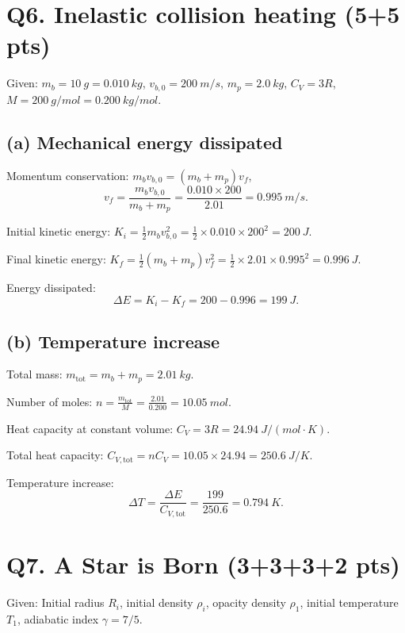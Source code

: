 \documentclass[11pt]{article}
\newcommand{\ans}[1]{\boxed{\displaystyle #1}}
\begin{document}
\section*{Q6. Inelastic collision heating (5+5 pts)}

Given: \(m_b = \SI{10}{g} = \SI{0.010}{kg}\),
\(v_{b,0} = \SI{200}{m/s}\),
\(m_p = \SI{2.0}{kg}\),
\(C_V = 3R\),
\(M = \SI{200}{g/mol} = \SI{0.200}{kg/mol}\).

\subsection*{(a) Mechanical energy dissipated}
Momentum conservation: \(m_b v_{b,0} = (m_b + m_p)v_f\),
\[
v_f = \frac{m_b v_{b,0}}{m_b + m_p} = \frac{0.010 \times 200}{2.01} = \SI{0.995}{m/s}.
\]

Initial kinetic energy: \(K_i = \frac{1}{2}m_b v_{b,0}^2 = \frac{1}{2} \times 0.010 \times 200^2 = \SI{200}{J}\).

Final kinetic energy: \(K_f = \frac{1}{2}(m_b + m_p)v_f^2 = \frac{1}{2} \times 2.01 \times 0.995^2 = \SI{0.996}{J}\).

Energy dissipated:
\[
\Delta E = K_i - K_f = 200 - 0.996 = \ans{\SI{199}{J}}.
\]

\subsection*{(b) Temperature increase}
Total mass: \(m_{\text{tot}} = m_b + m_p = \SI{2.01}{kg}\).

Number of moles: \(n = \frac{m_{\text{tot}}}{M} = \frac{2.01}{0.200} = \SI{10.05}{mol}\).

Heat capacity at constant volume: \(C_V = 3R = \SI{24.94}{J/(mol\cdot K)}\).

Total heat capacity: \(C_{V,\text{tot}} = n C_V = 10.05 \times 24.94 = \SI{250.6}{J/K}\).

Temperature increase:
\[
\Delta T = \frac{\Delta E}{C_{V,\text{tot}}} = \frac{199}{250.6} = \ans{\SI{0.794}{K}}.
\]

\section*{Q7. A Star is Born (3+3+3+2 pts)}

Given: Initial radius \(R_i\), initial density \(\rho_i\),
opacity density \(\rho_1\), initial temperature \(T_1\),
adiabatic index \(\gamma = 7/5\).
\end{document}
